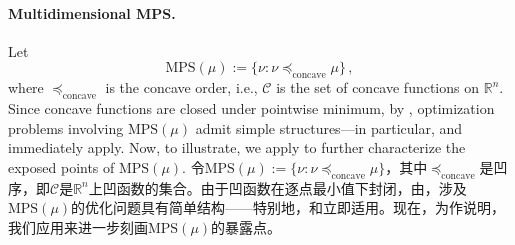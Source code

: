 \documentclass[12pt,letterpaper]{article}
\newenvironment{original}{\color{black}}{}
\newenvironment{translation}{\color{blue}}{}
\theoremstyle{plain}
\theoremstyle{definition}
\theoremstyle{remark}
\newcommand{\C}{\mathcal{C}}
\newcommand{\R}{\mathds{R}}
\theoremstyle{definition}
\begin{document}
\paragraph{Multidimensional MPS.}\hspace{-2mm}
\begin{original}
Let
\[\text{MPS}(\mu) := \big\{\nu: \nu \preceq_{\text{concave}} \mu\big\}\,,\]
where $\preceq_{\text{concave}}$ is the concave order, i.e., $\C$ is the set of concave functions on $\R^n$. Since concave functions are closed under pointwise minimum, by , optimization problems involving $\text{MPS}(\mu)$ admit simple structures---in particular,  and  immediately apply. Now, to illustrate, we apply  to further characterize the exposed points of $\text{MPS}(\mu)$.
\end{original}
\begin{translation}
令$\text{MPS}(\mu) := \{\nu: \nu \preceq_{\text{concave}} \mu\}$，其中$\preceq_{\text{concave}}$是凹序，即$\C$是$\R^n$上凹函数的集合。由于凹函数在逐点最小值下封闭，由，涉及$\text{MPS}(\mu)$的优化问题具有简单结构——特别地，和立即适用。现在，为作说明，我们应用来进一步刻画$\text{MPS}(\mu)$的暴露点。
\end{translation}
\end{document}
